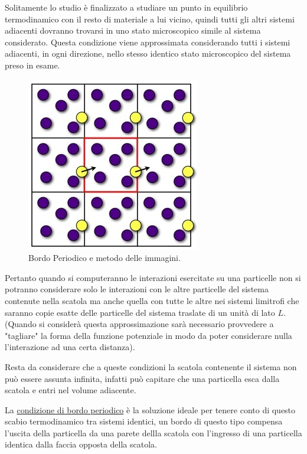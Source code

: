 \documentclass[11pt]{article}
\theoremstyle{plain}
\theoremstyle{remark}
\begin{document}
\begin{itemize}
Solitamente lo studio è finalizzato a studiare un punto in equilibrio termodinamico con il resto di materiale a lui vicino, quindi tutti gli altri sistemi adiacenti dovranno trovarsi in uno stato microscopico simile al sistema considerato.
\newline
Questa condizione viene approssimata considerando tutti i sistemi adiacenti, in ogni direzione, nello stesso identico stato microscopico del sistema preso in esame. 

	\begin{figure}[htbp]
		\centering
		\includegraphics[scale=0.5]{Immagini/BordoPeriodo.jpg}
		\caption[Bordo Periodico]{Bordo Periodico e metodo delle immagini.}\label{fig: BordoPeriodo}
	\end{figure}

Pertanto quando si computeranno le interazioni esercitate su una particelle non si potranno considerare solo le interazioni con le altre particelle del sistema contenute nella scatola ma anche quella con tutte le altre nei sistemi limitrofi che saranno copie esatte delle particelle del sistema traslate di un unità di lato $L$.
(Quando si considerà questa approssimazione sarà necessario provvedere a "tagliare" la forma della funzione potenziale in modo da poter considerare nulla l'interazione ad una certa distanza).

Resta da considerare che a queste condizioni la scatola contenente il sistema non può essere assunta infinita, infatti può capitare che una particella esca dalla scatola e entri nel volume adiacente.

La \underline{condizione di bordo periodico} è la soluzione ideale per tenere conto di questo scabio termodinamico tra sistemi identici, un bordo di questo tipo compensa l'uscita della particella da una parete dellla scatola con l'ingresso di una particella identica dalla faccia opposta della scatola.



\end{itemize}
\end{document}
